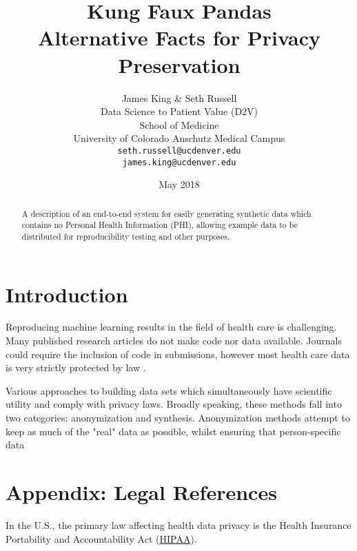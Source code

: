 \documentclass{article}
\title{%
  Kung Faux Pandas \\
  \large Alternative Facts for 
    Privacy Preservation}
\author{
  James King \& Seth Russell\\
  Data Science to Patient Value (D2V)\\
  School of Medicine \\
  University of Colorado Anschutz Medical Campus\\
  \texttt{seth.russell@ucdenver.edu} \\
  \texttt{james.king@ucdenver.edu} \\ 
  }
\date{May 2018}
\begin{document}

\maketitle

\begin{abstract}
A description of an end-to-end system for easily generating synthetic data which contains no Personal Health Information (PHI), allowing example data to be distributed for reproducibility testing and other purposes.  

\end{abstract}



\section{Introduction}

Reproducing machine learning results in the field of health care is challenging. Many published research articles do not make code nor data available. Journals could require the inclusion of code in submissions, however most health care data is very strictly protected by law \cite{hippapro}.  

Various approaches to building data sets which simultaneously have scientific utility and comply with privacy laws.  Broadly speaking, these methods fall into two categories: anonymization and synthesis.  Anonymization methods attempt to keep as much of the "real" data as possible, whilst ensuring that person-specific data 





\section{Appendix: Legal References}
In the U.S., the primary law affecting health data privacy is the Health Insurance Portability and Accountability Act (\href{https://www.hhs.gov/hipaa/for-professionals/index.html}{HIPAA}). 
\end{document}
